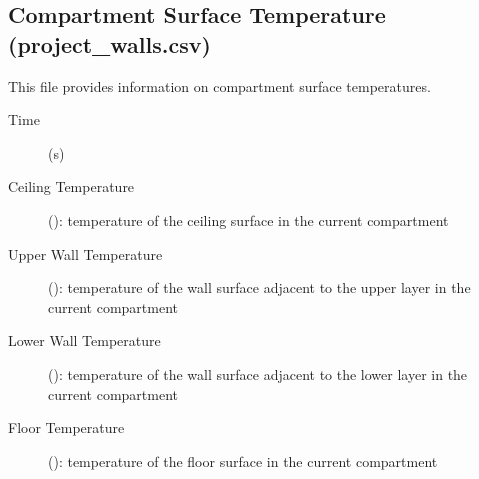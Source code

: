 \subsection{Compartment Surface Temperature (project\_walls.csv)}

This file provides information on compartment surface temperatures.
\begin{description}
\item[Time] (s)
\item[Ceiling Temperature] (\degc): temperature of the ceiling surface in the current compartment
\item[Upper Wall Temperature] (\degc): temperature of the wall surface adjacent to the upper layer in the current compartment
\item[Lower Wall Temperature] (\degc): temperature of the  wall surface adjacent to the lower layer in the current compartment
\item[Floor Temperature] (\degc): temperature of the floor surface in the current compartment
\end{description}

